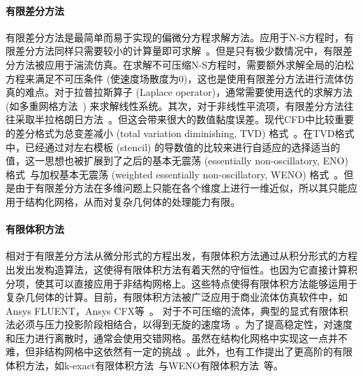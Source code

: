 \paragraph{有限差分方法}
有限差分方法是最简单而易于实现的偏微分方程求解方法。应用于N-S方程时，有限差分方法同样只需要较小的计算量即可求解~\cite{kooij2018comparison,vreman2014comparison}。但是只有极少数情况中，有限差分方法被应用于湍流仿真。在求解不可压缩N-S方程时，需要额外求解全局的泊松方程来满足不可压条件 (使速度场散度为0)，这也是使用有限差分方法进行流体仿真的难点。对于拉普拉斯算子 (Laplace operator)，通常需要使用迭代的求解方法 (如多重网格方法~\cite{golub2013matrix}) 来求解线性系统。其次，对于非线性平流项，有限差分方法往往采取半拉格朗日方法~\cite{smolarkiewicz1992class}。但这会带来很大的数值黏度误差。现代CFD中比较重要的差分格式为总变差减小 (total variation diminishing, TVD) 格式~\cite{osher1986very, YEE1985327, HARTEN1983357}。在TVD格式中，已经通过对左右模板 (stencil) 的导数值的比较来进行自适应的选择适当的值，这一思想也被扩展到了之后的基本无震荡 (essentially non-oscillatory, ENO) 格式~\cite{HARTEN19973, SHU198932, SHU1988439}与加权基本无震荡 (weighted essentially non-oscillatory, WENO) 格式~\cite{LIU1994200}。但是由于有限差分方法在多维问题上只能在各个维度上进行一维近似，所以其只能应用于结构化网格，从而对复杂几何体的处理能力有限。

\paragraph{有限体积方法}
相对于有限差分方法从微分形式的方程出发，有限体积方法通过从积分形式的方程出发出发构造算法，这使得有限体积方法有着天然的守恒性。也因为它直接计算积分项，使其可以直接应用于非结构网格上。这些特点使得有限体积方法能够运用于复杂几何体的计算。目前，有限体积方法被广泛应用于商业流体仿真软件中，如Ansys FLUENT，Ansys CFX等~\cite{JEONG201419}。 
对于不可压缩的流体，典型的显式有限体积法必须与压力投影阶段相结合，以得到无旋的速度场~\cite{https://doi.org/10.1002/fld.310, pember1996higher}。为了提高稳定性，对速度和压力进行离散时，通常会使用交错网格。虽然在结构化网格中实现这一点并不难，但非结构网格中这依然有一定的挑战~\cite{herbin2012staggered, gao2012unstructured, bermudez1998upwind}。此外，也有工作提出了更高阶的有限体积方法，如k-exact有限体积方法~\cite{barth1990higher}与WENO有限体积方法~\cite{HU199997}等。

